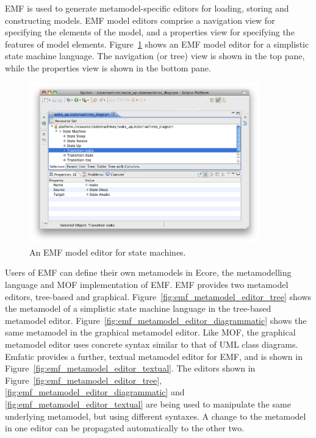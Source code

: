 EMF is used to generate metamodel-specific editors for loading, storing and constructing models. EMF model editors comprise a navigation view for specifying the elements of the model, and a properties view for specifying the features of model elements. Figure~\ref{fig:emf_model_editor} shows an EMF model editor for a simplistic state machine language. The navigation (or tree) view is shown in the top pane, while the properties view is shown in the bottom pane.

\begin{figure}[htbp]
  \begin{center}
    \leavevmode
    \includegraphics[width=10cm]{2.Background/images/emf_model_editor.png}
  \end{center}
  \caption{An EMF model editor for state machines.}
  \label{fig:emf_model_editor}
\end{figure}

Users of EMF can define their own metamodels in Ecore, the metamodelling language and MOF implementation of EMF. EMF provides two metamodel editors, tree-based and graphical. Figure~\ref{fig:emf_metamodel_editor_tree} shows the metamodel of a simplistic state machine language in the tree-based metamodel editor. Figure~\ref{fig:emf_metamodel_editor_diagrammatic} shows the same metamodel in the graphical metamodel editor. Like MOF, the graphical metamodel editor uses concrete syntax similar to that of UML class diagrams. Emfatic \cite{emfatic} provides a further, textual metamodel editor for EMF, and is shown in Figure~\ref{fig:emf_metamodel_editor_textual}. The editors shown in Figure~\ref{fig:emf_metamodel_editor_tree}, \ref{fig:emf_metamodel_editor_diagrammatic} and \ref{fig:emf_metamodel_editor_textual} are being used to manipulate the same underlying metamodel, but using different syntaxes. A change to the metamodel in one editor can be propagated automatically to the other two.

